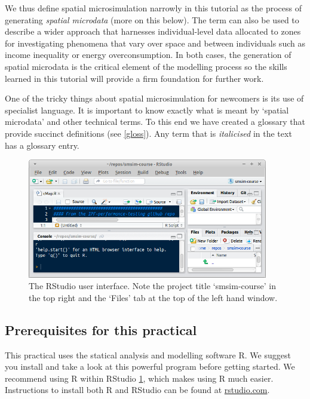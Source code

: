 \documentclass[a4paper, 11pt, twoside]{article}
\begin{document}
We thus define spatial microsimulation narrowly in this tutorial as the process
of generating \emph{spatial microdata} (more on this below). The term
can also be used to describe a wider approach that harnesses individual-level data
allocated to zones for investigating phenomena that vary over space and between individuals
such as income inequality or energy overconsumption. In both cases, the generation
of spatial microdata is the critical element of the modelling process so the skills
learned in this tutorial will provide a firm foundation for further work.

One of the tricky things about spatial microsimulation for newcomers is its use
of specialist language. It is important to know exactly what is meant by
`spatial microdata' and other technical terms. To this end we have created a
glossary that provide succinct definitions (see \cref{gloss}). Any term that is
\emph{italicised} in the text has a glossary entry.

\begin{figure}
\begin{center}
   \includegraphics[width=10.5cm]{rstudio}
\end{center}
 \caption{The RStudio user interface. Note the project title `smsim-course' in
the top right and the `Files' tab at the top of the left hand window.}
\label{frstudio}
\end{figure}

\subsection{Prerequisites for this practical}

This practical uses the statical analysis and modelling software
R. We suggest you install and take a look at this powerful program
before getting started. We recommend using R within RStudio \cref{frstudio}, which makes
using R much easier. Instructions to install both R and RStudio can be found
at \href{http://www.rstudio.com/ide/download/desktop}{rstudio.com}.
\end{document}
